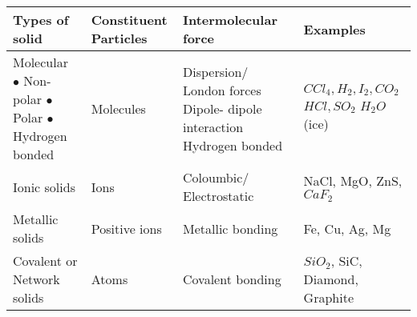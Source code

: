 \begin{table}[H]
	\overfullrule=0pt
	\renewcommand*{\arraystretch}{1.5}
	\begin{tabular}{|m{3.5 cm}|m{3.5 cm}|m{4.5cm}|m{5cm}| }
		\hline
		
		\textbf{Types of solid}& \textbf{Constituent Particles}& \textbf{Intermolecular force}& \textbf{Examples} \\\hline
		Molecular \newline $\bullet$ Non- polar \newline $\bullet$ Polar \newline $\bullet$ Hydrogen bonded &\vspace{0.5 cm}  Molecules & \vspace{0.25 cm} Dispersion/ London forces \newline Dipole- dipole interaction \newline Hydrogen bonded & \vspace{0.25 cm} $CCl_{4}, H_{2}, I_{2}, CO_{2}$ \newline $HCl, SO_{2}$ \newline $H_{2}O$ (ice)\\ \hline 
		Ionic solids & Ions & Coloumbic/ Electrostatic & NaCl, MgO, ZnS, $CaF_{2}$\\ \hline
		Metallic solids & Positive ions & Metallic bonding & Fe, Cu, Ag, Mg\\ \hline
		Covalent or Network solids & Atoms & Covalent bonding & $SiO_{2}$, SiC, Diamond, Graphite\\ \hline
	\end{tabular}
\end{table}

